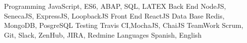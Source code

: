 


\begin{cvskills}

\cvskill
{Programming} %
{JavaScript, ES6, ABAP, SQL, LATEX} %
\cvskill
{Back End} %
{NodeJS,  SenecaJS, ExpressJS, LoopbackJS} %
\cvskill
{Front End} %
{ReactJS} %
\cvskill
{Data Base} %
{Redis, MongoDB, PosgreSQL} %
\cvskill
{Testing} %
{Travis CI,MochaJS, ChaiJS} %
\cvskill
{TeamWork} %
{Scrum, Git, Slack, ZenHub, JIRA, Redmine} %
\cvskill
{Languages} %
{Spanish, English} %
\end{cvskills}
